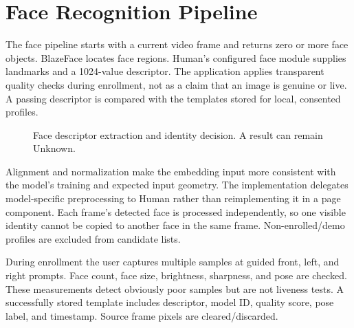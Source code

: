 \documentclass[11pt,oneside,openany]{report}
\begin{document}
\chapter{Face Recognition Pipeline}
The face pipeline starts with a current video frame and returns zero or more face objects. BlazeFace locates face regions. Human's configured face module supplies landmarks and a 1024-value descriptor. The application applies transparent quality checks during enrollment, not as a claim that an image is genuine or live. A passing descriptor is compared with the templates stored for local, consented profiles.

\begin{figure}[htbp]
\centering
{}
\caption{Face descriptor extraction and identity decision. A result can remain Unknown.}
\label{fig:face-pipeline}
\end{figure}

Alignment and normalization make the embedding input more consistent with the model's training and expected input geometry. The implementation delegates model-specific preprocessing to Human rather than reimplementing it in a page component. Each frame's detected face is processed independently, so one visible identity cannot be copied to another face in the same frame. Non-enrolled/demo profiles are excluded from candidate lists.

During enrollment the user captures multiple samples at guided front, left, and right prompts. Face count, face size, brightness, sharpness, and pose are checked. These measurements detect obviously poor samples but are not liveness tests. A successfully stored template includes descriptor, model ID, quality score, pose label, and timestamp. Source frame pixels are cleared/discarded.
\end{document}
